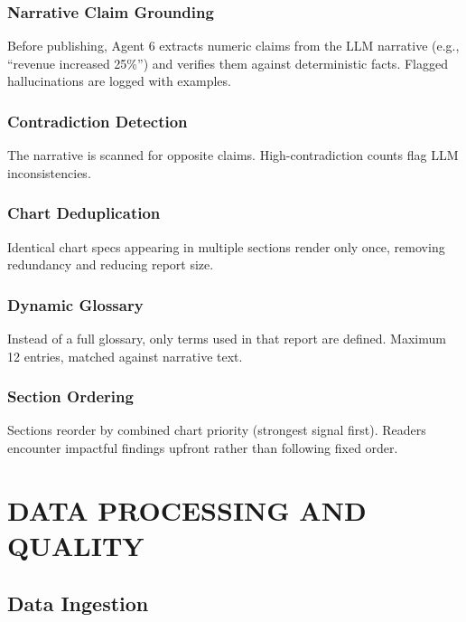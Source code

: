 \documentclass[12pt,a4paper,openany]{report}
\begin{document}
\subsection{Narrative Claim Grounding}

Before publishing, Agent 6 extracts numeric claims from the LLM narrative (e.g., ``revenue increased 25\%'') and verifies them against deterministic facts. Flagged hallucinations are logged with examples.

\subsection{Contradiction Detection}

The narrative is scanned for opposite claims. High-contradiction counts flag LLM inconsistencies.

\subsection{Chart Deduplication}

Identical chart specs appearing in multiple sections render only once, removing redundancy and reducing report size.

\subsection{Dynamic Glossary}

Instead of a full glossary, only terms used in that report are defined. Maximum 12 entries, matched against narrative text.

\subsection{Section Ordering}

Sections reorder by combined chart priority (strongest signal first). Readers encounter impactful findings upfront rather than following fixed order.

\chapter{DATA PROCESSING AND QUALITY}
\label{ch:processing}

\section{Data Ingestion}
\end{document}

